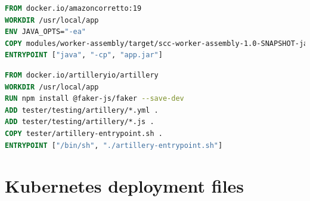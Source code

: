 \documentclass[runningheads]{llncs}
\begin{document}
\begin{lstlisting}[language=Dockerfile, caption=worker.dockerfile]
FROM docker.io/amazoncorretto:19
WORKDIR /usr/local/app
ENV JAVA_OPTS="-ea"
COPY modules/worker-assembly/target/scc-worker-assembly-1.0-SNAPSHOT-jar-with-dependencies.jar app.jar
ENTRYPOINT ["java", "-cp", "app.jar"]
\end{lstlisting}

\begin{lstlisting}[language=Dockerfile, caption=tester.dockerfile]
FROM docker.io/artilleryio/artillery
WORKDIR /usr/local/app
RUN npm install @faker-js/faker --save-dev
ADD tester/testing/artillery/*.yml .
ADD tester/testing/artillery/*.js .
COPY tester/artillery-entrypoint.sh .
ENTRYPOINT ["/bin/sh", "./artillery-entrypoint.sh"]
\end{lstlisting}

\section{Kubernetes deployment files}
\end{document}
